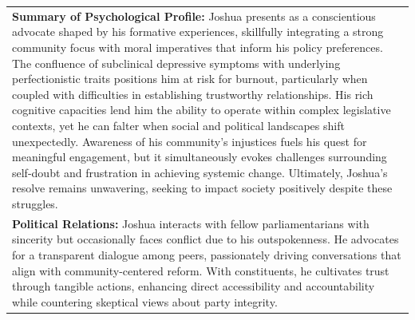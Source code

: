 \documentclass[11pt]{article}
\begin{document}
\begin{table}[ht]
\begin{tabularx}{\textwidth}{X}
\textbf{Summary of Psychological Profile:} Joshua presents as a conscientious advocate shaped by his formative experiences, skillfully integrating a strong community focus with moral imperatives that inform his policy preferences. The confluence of subclinical depressive symptoms with underlying perfectionistic traits positions him at risk for burnout, particularly when coupled with difficulties in establishing trustworthy relationships. His rich cognitive capacities lend him the ability to operate within complex legislative contexts, yet he can falter when social and political landscapes shift unexpectedly. Awareness of his community’s injustices fuels his quest for meaningful engagement, but it simultaneously evokes challenges surrounding self-doubt and frustration in achieving systemic change. Ultimately, Joshua's resolve remains unwavering, seeking to impact society positively despite these struggles. \\[4pt]

\textbf{Political Relations:} Joshua interacts with fellow parliamentarians with sincerity but occasionally faces conflict due to his outspokenness. He advocates for a transparent dialogue among peers, passionately driving conversations that align with community-centered reform. With constituents, he cultivates trust through tangible actions, enhancing direct accessibility and accountability while countering skeptical views about party integrity. \\

\bottomrule
\end{tabularx}
\end{table}
\end{document}
